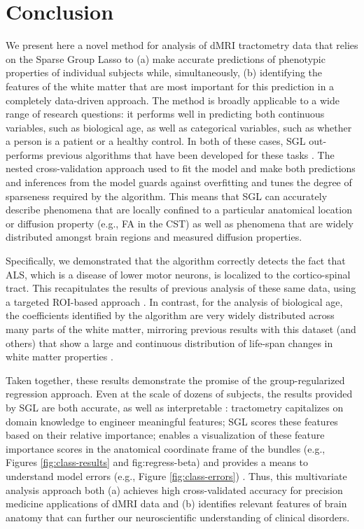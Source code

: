 \section*{Conclusion}

We present here a novel method for analysis of dMRI tractometry data that relies
on the Sparse Group Lasso \cite{simon2013sparse} to (a) make accurate
predictions of phenotypic properties of individual subjects while,
simultaneously, (b) identifying the features of the white matter that are most
important for this prediction in a completely data-driven approach. The method
is broadly applicable to a wide range of research questions: it performs well in
predicting both continuous variables, such as biological age, as well as
categorical variables, such as whether a person is a patient or a healthy
control. In both of these cases, SGL out-performs previous algorithms that have
been developed for these tasks \cite{sarica2017corticospinal, Richard2018-ux}.
The nested cross-validation approach used to fit the model and make both
predictions and inferences from the model guards against overfitting and tunes
the degree of sparseness required by the algorithm. This means that SGL can
accurately describe phenomena that are locally confined to a particular
anatomical location or diffusion property (e.g., FA in the CST) as well as
phenomena that are widely distributed amongst brain regions and measured
diffusion properties.

Specifically, we demonstrated that the algorithm correctly detects
the fact that ALS, which is a disease of lower motor neurons, is
localized to the cortico-spinal tract. This recapitulates the results
of previous analysis of these same data, using a targeted ROI-based
approach \cite{sarica2017corticospinal}. In contrast, for the analysis
of biological age, the coefficients identified by the algorithm are very
widely distributed across many parts of the white matter, mirroring
previous results with this dataset (and others) that show a large and
continuous distribution of life-span changes in white matter properties
\cite{yeatman2014lifespan}.

Taken together, these results demonstrate the promise of the group-regularized
regression approach. Even at the scale of dozens of subjects, the results
provided by SGL are both accurate, as well as interpretable
\cite{Murdoch2019-ax}: tractometry capitalizes on domain knowledge to engineer
meaningful features; SGL scores these features based on their relative
importance; enables a visualization of these feature importance scores in the
anatomical coordinate frame of the bundles (e.g., Figures \ref{fig:class-results}
and fig:regress-beta) and provides a means to understand model errors (e.g.,
Figure \ref{fig:class-errors}) . Thus, this multivariate analysis approach both
(a) achieves high cross-validated accuracy for precision medicine applications
of dMRI data and (b) identifies relevant features of brain anatomy that can
further our neuroscientific understanding of clinical disorders.

